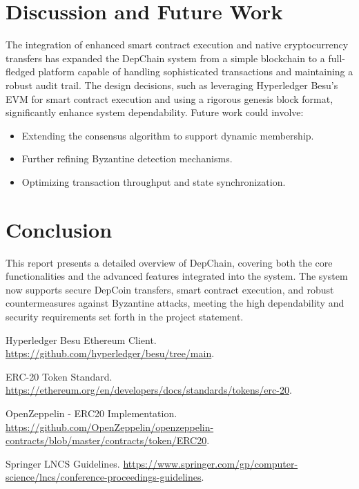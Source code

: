 \documentclass[runningheads]{llncs}
\begin{document}
\section{Discussion and Future Work}
The integration of enhanced smart contract execution and native cryptocurrency
transfers has expanded the DepChain system from a simple blockchain to a
full-fledged platform capable of handling sophisticated transactions and
maintaining a robust audit trail. The design decisions, such as leveraging
Hyperledger Besu's EVM for smart contract execution and using a rigorous genesis
block format, significantly enhance system dependability. Future work could
involve:
\begin{itemize}
    \item Extending the consensus algorithm to support dynamic membership.
    \item Further refining Byzantine detection mechanisms.
    \item Optimizing transaction throughput and state synchronization.
\end{itemize}

\section{Conclusion}
This report presents a detailed overview of DepChain, covering both the core
functionalities and the advanced features integrated into the system. The system
now supports secure DepCoin transfers, smart contract execution, and robust
countermeasures against Byzantine attacks, meeting the high dependability and
security requirements set forth in the project statement.


\begin{thebibliography}{4}
Hyperledger Besu Ethereum Client.
\url{https://github.com/hyperledger/besu/tree/main}.

ERC-20 Token Standard.
\url{https://ethereum.org/en/developers/docs/standards/tokens/erc-20}.

OpenZeppelin - ERC20 Implementation.
\url{https://github.com/OpenZeppelin/openzeppelin-contracts/blob/master/contracts/token/ERC20}.

Springer LNCS Guidelines.
\url{https://www.springer.com/gp/computer-science/lncs/conference-proceedings-guidelines}.
\end{thebibliography}
\end{document}
